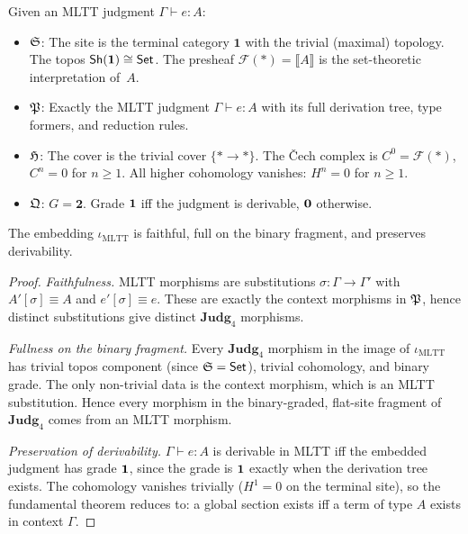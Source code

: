 \begin{construction}
\label{con:mltt-embed}
Given an MLTT judgment $\Gamma \vdash e : A$:
\begin{itemize}[nosep]
\item $\mathfrak{S}$: The site is the terminal category $\mathbf{1}$ with
  the trivial (maximal) topology.  The topos
  $\mathsf{Sh}(\mathbf{1}) \cong \mathsf{Set}$.  The presheaf
  $\mathcal{F}(*) = \llbracket A \rrbracket$ is the set-theoretic
  interpretation of~$A$.

\item $\mathfrak{P}$: Exactly the MLTT judgment $\Gamma \vdash e : A$ with
  its full derivation tree, type formers, and reduction rules.

\item $\mathfrak{H}$: The cover is the trivial cover $\{* \to *\}$.
  The \v{C}ech complex is $C^0 = \mathcal{F}(*)$,
  $C^n = 0$ for $n \geq 1$.  All higher cohomology vanishes:
  $H^n = 0$ for $n \geq 1$.

\item $\mathfrak{Q}$: $G = \mathbf{2}$.  Grade $\mathbf{1}$ iff
  the judgment is derivable, $\mathbf{0}$ otherwise.
\end{itemize}
\end{construction}

\begin{theorem}
\label{thm:mltt}
The embedding $\iota_{\mathrm{MLTT}}$ is faithful, full on the binary
fragment, and preserves derivability.
\end{theorem}

\begin{proof}
\emph{Faithfulness.}  MLTT morphisms are substitutions
$\sigma : \Gamma \to \Gamma'$ with $A'[\sigma] \equiv A$ and
$e'[\sigma] \equiv e$.  These are exactly the context morphisms
in $\mathfrak{P}$, hence distinct substitutions give distinct
$\mathbf{Judg}_4$ morphisms.

\emph{Fullness on the binary fragment.}  Every $\mathbf{Judg}_4$
morphism in the image of $\iota_{\mathrm{MLTT}}$ has trivial topos
component (since $\mathfrak{S} = \mathsf{Set}$), trivial cohomology, and binary
grade.  The only non-trivial data is the context morphism, which is
an MLTT substitution.  Hence every morphism in the binary-graded,
flat-site fragment of $\mathbf{Judg}_4$ comes from an MLTT morphism.

\emph{Preservation of derivability.}  $\Gamma \vdash e : A$ is
derivable in MLTT iff the embedded judgment has grade $\mathbf{1}$, since
the grade is $\mathbf{1}$ exactly when the derivation tree exists.
The cohomology vanishes trivially ($H^1 = 0$ on the terminal site),
so the fundamental theorem reduces to: a global section exists iff
a term of type $A$ exists in context $\Gamma$.
\end{proof}

